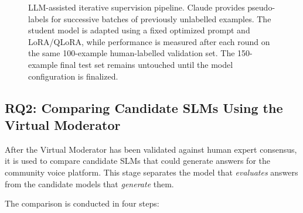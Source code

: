 \documentclass[11pt,a4paper]{article}
\begin{document}
\begin{figure}[H]

\caption{LLM-assisted iterative supervision pipeline. Claude provides
pseudo-labels for successive batches of previously unlabelled examples. The
student model is adapted using a fixed optimized prompt and LoRA/QLoRA, while
performance is measured after each round on the same 100-example human-labelled
validation set. The 150-example final test set remains untouched until the
model configuration is finalized.}
\label{fig:llm-assisted-iterative-supervision}
\end{figure}

\subsection{RQ2: Comparing Candidate SLMs Using the Virtual Moderator}
\label{subsec:rq2}

After the Virtual Moderator has been validated against human expert consensus,
it is used to compare candidate SLMs that could generate answers for the
community voice platform. This stage separates the model that \emph{evaluates}
answers from the candidate models that \emph{generate} them.

The comparison is conducted in four steps:
\end{document}
